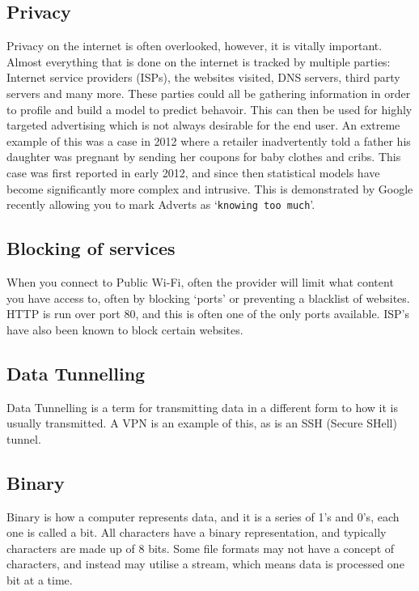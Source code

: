 \subsection{Privacy}
Privacy on the internet is often overlooked, however, it is vitally important\cite{privacyrulez}. Almost everything that is done on the internet is tracked by multiple parties: Internet service providers (ISPs), the websites visited, DNS servers, third party servers and many more. These parties could all be gathering information in order to profile and build a model to predict behavoir. This can then be used for highly targeted advertising which is not always desirable for the end user. An extreme example of this was a case in 2012 where a retailer inadvertently told a father his daughter was pregnant by sending her coupons for baby clothes and cribs.\cite{babyshower}
This case was first reported in early 2012, and since then statistical models have become significantly more complex and intrusive. This is demonstrated by Google recently allowing you to mark Adverts as `\texttt{knowing too much}'\cite{googlearewatching}.

\subsection{Blocking of services}
When you connect to Public Wi-Fi, often the provider will limit what content you have access to, often by blocking `ports' or preventing a blacklist of websites.\\
HTTP is run over port 80, and this is often one of the only ports available. ISP's have also been known to block certain websites.

\subsection{Data Tunnelling}
Data Tunnelling is a term for transmitting data in a different form to how it is usually transmitted. A VPN is an example of this, as is an SSH (Secure SHell) tunnel.

\subsection{Binary}
Binary is how a computer represents data, and it is a series of 1's and 0's, each one is called a bit.
All characters have a binary representation, and typically characters are made up of 8 bits. Some file formats may not have a concept of characters, and instead may utilise a stream, which means data is processed one bit at a time.

